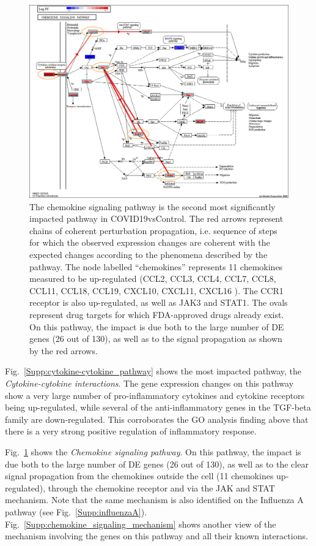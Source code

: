 \begin{figure}
\centering
	\includegraphics[width=0.9\linewidth]{Figures/Chemokine_signaling_pathway.png}
    \caption{ The chemokine signaling pathway is the second most significantly impacted pathway in COVID19vsControl. The red arrows represent chains of coherent perturbation propagation, i.e. sequence of steps for which the observed expression changes are coherent with the expected changes according to the phenomena described by the pathway. The node labelled ``chemokines'' represents 11 chemokines measured to be up-regulated (CCL2, CCL3, CCL4, CCL7, CCL8, CCL11,  CCL18, CCL19, CXCL10, CXCL11, CXCL16 ). The CCR1 receptor is also up-regulated, as well as  JAK3 and STAT1. The ovals represent drug targets for which FDA-approved drugs already exist. %
    On this pathway, the impact is due both to the large number of DE genes  (26 out of 130), as well as to the signal propagation as shown by the red arrows. }
        \label{Supp:drugs_on_chemokine_signaling}
\end{figure}

Fig.~\ref{Supp:cytokine-cytokine_pathway} shows the most impacted pathway, the \emph{Cytokine-cytokine interactions}. 
The gene expression changes on this pathway  show a very large number of pro-inflammatory cytokines and cytokine receptors being up-regulated, while several of the anti-inflammatory genes in the TGF-beta family are down-regulated. This corroborates the GO analysis finding above that there is a very strong positive regulation of inflammatory response. 
\color{black}


Fig.~\ref{Supp:drugs_on_chemokine_signaling} shows the \emph{Chemokine signaling pathway}.  
On this pathway, the impact is due both to the large number of DE genes (26 out of 130), as well as to the clear signal propagation from the chemokines outside the cell (11 chemokines up-regulated), through the chemokine receptor and via the JAK and STAT mechanism. 
Note that the same mechanism is also identified on the Influenza A pathway (see Fig.~\ref{Supp:influenzaA}). 
Fig.~\ref{Supp:chemokine_signaling_mechanism} shows another view of the mechanism involving the genes on this pathway and all their known interactions.

